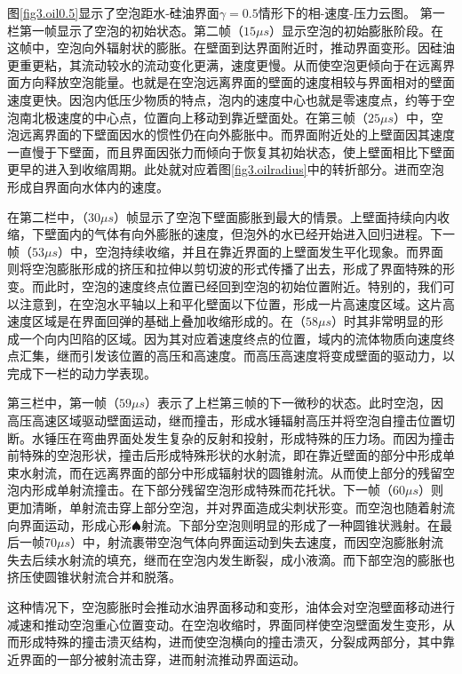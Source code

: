 图\ref{fig3.oil0.5}显示了空泡距水-硅油界面$\gamma = 0.5$情形下的相-速度-压力云图。
第一栏第一帧显示了空泡的初始状态。第二帧（$ 15\mu s$）显示空泡的初始膨胀阶段。在这帧中，空泡向外辐射状的膨胀。在壁面到达界面附近时，推动界面变形。因硅油更重更粘，其流动较水的流动变化更满，速度更慢。从而使空泡更倾向于在远离界面方向释放空泡能量。也就是在空泡远离界面的壁面的速度相较与界面相对的壁面速度更快。因泡内低压少物质的特点，泡内的速度中心也就是零速度点，约等于空泡南北极速度的中心点，位置向上移动到靠近壁面处。在第三帧（$ 25\mu s$）中，空泡远离界面的下壁面因水的惯性仍在向外膨胀中。而界面附近处的上壁面因其速度一直慢于下壁面，而且界面因张力而倾向于恢复其初始状态，使上壁面相比下壁面更早的进入到收缩周期。此处就对应着图\ref{fig3.oilradius}中的转折部分。进而空泡形成自界面向水体内的速度。

在第二栏中，（$30\mu s$）帧显示了空泡下壁面膨胀到最大的情景。上壁面持续向内收缩，下壁面内的气体有向外膨胀的速度，但泡外的水已经开始进入回归进程。下一帧（$ 53\mu s$）中，空泡持续收缩，并且在靠近界面的上壁面发生平化现象。而界面则将空泡膨胀形成的挤压和拉伸以剪切波的形式传播了出去，形成了界面特殊的形变。而此时，空泡的速度终点位置已经回到空泡的初始位置附近。特别的，我们可以注意到，在空泡水平轴以上和平化壁面以下位置，形成一片高速度区域。这片高速度区域是在界面回弹的基础上叠加收缩形成的。在（$ 58\mu s$）时其非常明显的形成一个向内凹陷的区域。因为其对应着速度终点的位置，域内的流体物质向速度终点汇集，继而引发该位置的高压和高速度。而高压高速度将变成壁面的驱动力，以完成下一栏的动力学表现。

第三栏中，第一帧（$ 59\mu s$）表示了上栏第三帧的下一微秒的状态。此时空泡，因高压高速区域驱动壁面运动，继而撞击，形成水锤辐射高压并将空泡自撞击位置切断。水锤压在弯曲界面处发生复杂的反射和投射，形成特殊的压力场。而因为撞击前特殊的空泡形状，撞击后形成特殊形状的水射流，即在靠近壁面的部分中形成单束水射流，而在远离界面的部分中形成辐射状的圆锥射流。从而使上部分的残留空泡内形成单射流撞击。在下部分残留空泡形成特殊而花托状。下一帧（$ 60\mu s$）则更加清晰，单射流击穿上部分空泡，并对界面造成尖刺状形变。而空泡也随着射流向界面运动，形成心形$\spadesuit$射流。下部分空泡则明显的形成了一种圆锥状溅射。在最后一帧$ 70\mu s$）中，射流裹带空泡气体向界面运动到失去速度，而因空泡膨胀射流失去后续水射流的填充，继而在空泡内发生断裂，成小液滴。而下部空泡的膨胀也挤压使圆锥状射流合并和脱落。

这种情况下，空泡膨胀时会推动水油界面移动和变形，油体会对空泡壁面移动进行减速和推动空泡重心位置变动。在空泡收缩时，界面同样使空泡壁面发生变形，从而形成特殊的撞击溃灭结构，进而使空泡横向的撞击溃灭，分裂成两部分，其中靠近界面的一部分被射流击穿，进而射流推动界面运动。

